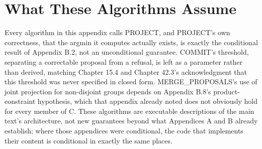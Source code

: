 \section{What These Algorithms Assume}

Every algorithm in this appendix calls PROJECT, and PROJECT's own correctness, that the argmin it computes actually exists, is exactly the conditional result of Appendix B.2, not an unconditional guarantee. COMMIT's threshold, separating a correctable proposal from a refusal, is left as a parameter rather than derived, matching Chapter 15.4 and Chapter 42.3's acknowledgment that this threshold was never specified in closed form. MERGE\_PROPOSALS's use of joint projection for non-disjoint groups depends on Appendix B.8's product-constraint hypothesis, which that appendix already noted does not obviously hold for every member of C. These algorithms are executable descriptions of the main text's architecture, not new guarantees beyond what Appendices A and B already establish; where those appendices were conditional, the code that implements their content is conditional in exactly the same places.
